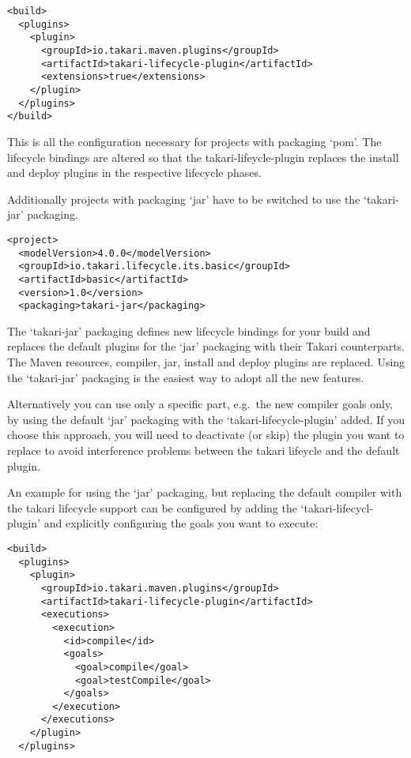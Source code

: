\documentclass[a4paper]{book}
\begin{document}
\begin{shaded}\begin{verbatim}
<build>
  <plugins>
    <plugin>
      <groupId>io.takari.maven.plugins</groupId>
      <artifactId>takari-lifecycle-plugin</artifactId>
      <extensions>true</extensions>
    </plugin>
  </plugins>
</build>
\end{verbatim}\end{shaded}

This is all the configuration necessary for projects with packaging `pom'. The lifecycle bindings are altered so that the takari-lifeycle-plugin replaces the install and deploy plugins in the respective lifecycle phases.

Additionally projects with packaging `jar' have to be switched to use the `takari-jar' packaging.

\begin{shaded}\begin{verbatim}
<project>
  <modelVersion>4.0.0</modelVersion>
  <groupId>io.takari.lifecycle.its.basic</groupId>
  <artifactId>basic</artifactId>
  <version>1.0</version>
  <packaging>takari-jar</packaging>
\end{verbatim}\end{shaded}

The `takari-jar' packaging defines new lifecycle bindings for your build and replaces the default plugins for the `jar' packaging with their Takari counterparts. The Maven resources, compiler, jar, install and deploy plugins are replaced. Using the `takari-jar' packaging is the easiest way to adopt all the new features.

Alternatively you can use only a specific part, e.g.~the new compiler goals only, by using the default `jar' packaging with the `takari-lifecycle-plugin' added. If you choose this approach, you will need to deactivate (or skip) the plugin you want to replace to avoid interference problems between the takari lifeycle and the default plugin.

An example for using the `jar' packaging, but replacing the default compiler with the takari lifecycle support can be configured by adding the `takari-lifecycl-plugin' and explicitly configuring the goals you want to execute:

\begin{shaded}\begin{verbatim}
<build>
  <plugins>
    <plugin>
      <groupId>io.takari.maven.plugins</groupId>
      <artifactId>takari-lifecycle-plugin</artifactId>
      <executions>
        <execution>
          <id>compile</id>
          <goals>
            <goal>compile</goal>
            <goal>testCompile</goal>
          </goals>
        </execution>
      </executions>
    </plugin>
  </plugins>
\end{verbatim}\end{shaded}
\end{document}
